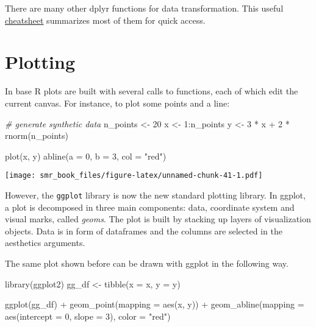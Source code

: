 \documentclass[
  oneside]{book}
\newenvironment{Shaded}{\begin{snugshade}}{\end{snugshade}}
\newcommand{\AttributeTok}[1]{\textcolor[rgb]{0.77,0.63,0.00}{#1}}
\newcommand{\CommentTok}[1]{\textcolor[rgb]{0.56,0.35,0.01}{\textit{#1}}}
\newcommand{\DecValTok}[1]{\textcolor[rgb]{0.00,0.00,0.81}{#1}}
\newcommand{\FunctionTok}[1]{\textcolor[rgb]{0.00,0.00,0.00}{#1}}
\newcommand{\NormalTok}[1]{#1}
\newcommand{\OtherTok}[1]{\textcolor[rgb]{0.56,0.35,0.01}{#1}}
\newcommand{\SpecialCharTok}[1]{\textcolor[rgb]{0.00,0.00,0.00}{#1}}
\newcommand{\StringTok}[1]{\textcolor[rgb]{0.31,0.60,0.02}{#1}}
\begin{document}
There are many other dplyr functions for data transformation. This useful
\href{https://github.com/rstudio/cheatsheets/blob/main/data-transformation.pdf}{cheatsheet}
summarizes most of them for quick access.

\hypertarget{plotting}{%
\section{Plotting}\label{plotting}}

In base R plots are built with several calls to functions, each of which
edit the current canvas. For instance, to plot some points and a line:

\begin{Shaded}
\begin{Highlighting}[]
\CommentTok{\# generate synthetic data}
\NormalTok{n\_points }\OtherTok{\textless{}{-}} \DecValTok{20}
\NormalTok{x }\OtherTok{\textless{}{-}} \DecValTok{1}\SpecialCharTok{:}\NormalTok{n\_points}
\NormalTok{y }\OtherTok{\textless{}{-}} \DecValTok{3} \SpecialCharTok{*}\NormalTok{ x }\SpecialCharTok{+} \DecValTok{2} \SpecialCharTok{*} \FunctionTok{rnorm}\NormalTok{(n\_points)}

\FunctionTok{plot}\NormalTok{(x, y)}
\FunctionTok{abline}\NormalTok{(}\AttributeTok{a =} \DecValTok{0}\NormalTok{, }\AttributeTok{b =} \DecValTok{3}\NormalTok{, }\AttributeTok{col =} \StringTok{"red"}\NormalTok{)}
\end{Highlighting}
\end{Shaded}

\texttt{[image: smr\_book\_files/figure-latex/unnamed-chunk-41-1.pdf]}

However, the \texttt{ggplot} library is now the new standard plotting library.
In ggplot, a plot is decomposed in three main components: data, coordinate
system and visual marks, called \emph{geoms}.
The plot is built by stacking up layers of visualization objects.
Data is in form of dataframes and the columns are selected in the aesthetics
arguments.

The same plot shown before can be drawn with ggplot in the following way.

\begin{Shaded}
\begin{Highlighting}[]
\FunctionTok{library}\NormalTok{(ggplot2)}
\NormalTok{gg\_df }\OtherTok{\textless{}{-}} \FunctionTok{tibble}\NormalTok{(}\AttributeTok{x =}\NormalTok{ x, }\AttributeTok{y =}\NormalTok{ y)}

\FunctionTok{ggplot}\NormalTok{(gg\_df) }\SpecialCharTok{+}
  \FunctionTok{geom\_point}\NormalTok{(}\AttributeTok{mapping =} \FunctionTok{aes}\NormalTok{(x, y)) }\SpecialCharTok{+}
  \FunctionTok{geom\_abline}\NormalTok{(}\AttributeTok{mapping =} \FunctionTok{aes}\NormalTok{(}\AttributeTok{intercept =} \DecValTok{0}\NormalTok{, }\AttributeTok{slope =} \DecValTok{3}\NormalTok{), }\AttributeTok{color =} \StringTok{"red"}\NormalTok{)}
\end{Highlighting}
\end{Shaded}
\end{document}
